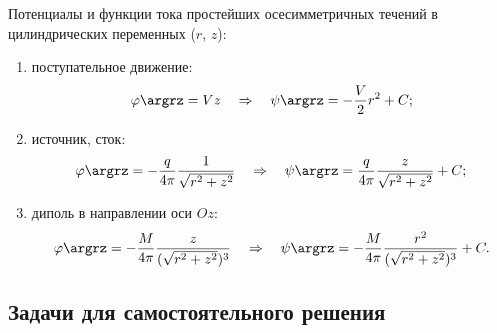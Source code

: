 \documentclass[a4paper, 14pt]{extarticle}
\begin{document}
Потенциалы и функции тока простейших осесимметричных течений в цилиндрических переменных ($r$, $z$):

\begin{enumerate}
	\item поступательное движение:
		\begin{equation}
			\label{eq:translation_3D}
			\varphi\argrz = V z \quad\Rightarrow\quad
			\psi\argrz = -\frac{V}{2}r^2 + C;
		\end{equation}
	\item  источник, сток:
		\begin{equation}
			\label{eq:source_3D}
			\varphi\argrz = -\frac{q}{4\pi} \frac{1}{\sqrt{r^2+z^2}}\quad\Rightarrow\quad
			\psi\argrz = \frac{q}{4\pi}\frac{z}{\sqrt{r^2+z^2}} + C;
		\end{equation}	
		\item диполь в направлении оси $Oz$:
			\begin{equation}
				\label{eq:dipol_3D}
				\varphi\argrz =  -\frac{M}{4\pi} \frac{z}{(\sqrt{r^2+z^2})^3}\quad\Rightarrow\quad
				\psi\argrz =  -\frac{M}{4\pi} \frac{r^2}{(\sqrt{r^2+z^2})^3}+C.
			\end{equation}
		
\end{enumerate}

\subsection{Задачи для самостоятельного решения}
\end{document}
